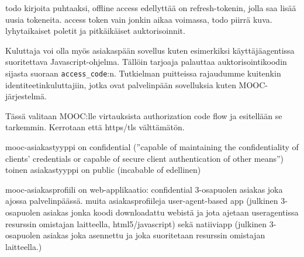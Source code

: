\documentclass[finnish,gradu]{tktltiki}
\begin{document}
  todo kirjoita puhtaaksi, offline access edellyttää on refresh-tokenin, jolla saa lisää uusia tokeneita.
  access token vain jonkin aikaa voimassa, todo piirrä kuva.
  lyhytaikaiset poletit ja pitkäikäiset auktorisoinnit.

  Kuluttaja voi olla myös asiakaspään sovellus kuten esimerkiksi käyttäjäagentissa suoritettava Javascript-ohjelma. Tällöin tarjoaja palauttaa auktorisointikoodin sijasta suoraan \verb!access_code!:n. Tutkielman puitteissa rajaudumme kuitenkin identiteetinkuluttajiin, jotka ovat palvelinpään sovelluksia kuten MOOC-järjestelmä.

  Tässä valitaan MOOC:lle virtauksista authorization code flow ja esitellään se tarkemmin.
  Kerrotaan että https/tls välttämätön.

  mooc-asiakastyyppi on confidential (''capable of maintaining the confidentiality of clients' credentials or capable of secure client authentication of other means'')
  toinen asiakastyyppi on public (incabable of edellinen)

  mooc-asiakasprofiili on web-applikaatio: confidential 3-osapuolen asiakas joka ajossa palvelinpäässä.
  muita asiakasprofiileja user-agent-based app (julkinen 3-osapuolen asiakas jonka koodi downloadattu webistä ja jota ajetaan useragentissa resurssin omistajan laitteella, html5/javascript) sekä natiiviapp (julkinen 3-osapuolen asiakas joka asennettu ja joka suoritetaan resurssin omistajan laitteella.)

\end{document}
